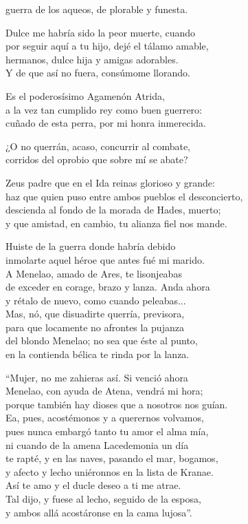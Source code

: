 guerra de los aqueos, de plorable y funesta.\par
\poend
%
\separator
%
\postart
{}
Dulce me habría sido la peor muerte, cuando\\
por seguir aquí a tu hijo, dejé el tálamo amable,\\
hermanos, dulce hija y amigas adorables.\\
Y de que así no fuera, consúmome llorando.\par
\poend
%
\separator
%
\postart
{}
Es el poderosísimo Agamenón Atrida,\\
a la vez tan cumplido rey como buen guerrero:\\
cuñado de esta perra, por mi honra inmerecida.\par
\poend
%
\separator
%
\postart
{}
¿O no querrán, acaso, concurrir al combate,\\
corridos del oprobio que sobre mí se abate?\par
\poend
%
\separator
%
\postart
{}
Zeus padre que en el Ida reinas glorioso y grande:\\
haz que quien puso entre ambos pueblos el desconcierto,\\
descienda al fondo de la morada de Hades, muerto;\\
y que amistad, en cambio, tu alianza fiel nos mande.\par
\poend
%
\separator
%
\postart
{}
Huiste de la guerra donde habría debido\\
inmolarte aquel héroe que antes fué mi marido.\\
A Menelao, amado de Ares, te lisonjeabas\\
de exceder en corage, brazo y lanza. Anda ahora\\
y rétalo de nuevo, como cuando peleabas...\\
Mas, nó, que disuadirte querría, previsora,\\
para que locamente no afrontes la pujanza\\
del blondo Menelao; no sea que éste al punto,\\
en la contienda bélica te rinda por la lanza.\par
\poend
%
\separator
%
\postart
{}``Mujer, no me zahieras así. Si venció ahora\\
Menelao, con ayuda de Atena, vendrá mi hora;\\
porque también hay dioses que a nosotros nos guían.\\
Ea, pues, acostémonos y a querernos volvamos,\\
pues nunca embargó tanto tu amor el alma mía,\\
ni cuando de la amena Lacedemonia un día\\
te rapté, y en las naves, pasando el mar, bogamos,\\
y afecto y lecho uniéronnos en la lista de Kranae.\\
Así te amo y el ducle deseo a ti me atrae.\\
Tal dijo, y fuese al lecho, seguido de la esposa,\\
y ambos allá acostáronse en la cama lujosa''.
\poend
%
\separator
%
\enum